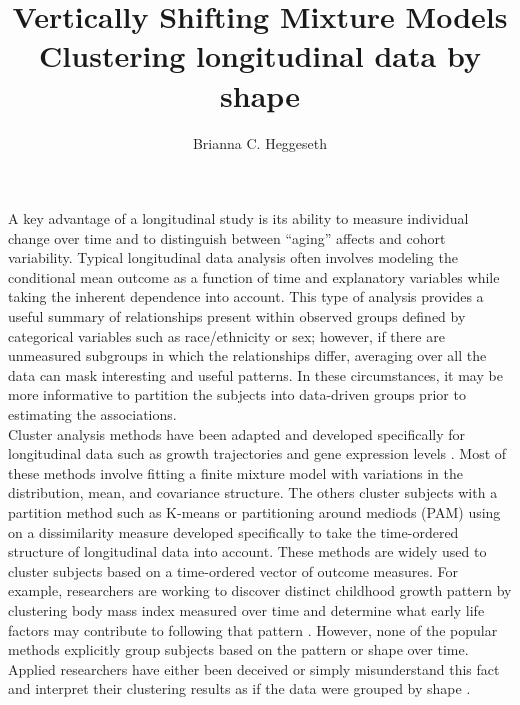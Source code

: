 \documentclass[12pt]{article}
\title{Vertically Shifting Mixture Models \\ Clustering longitudinal data by shape}
\author{Brianna C. Heggeseth}
\begin{document}
\doublespace
\maketitle

A key advantage of a longitudinal study is its ability to measure individual change over time and to distinguish between ``aging'' affects and cohort variability. Typical longitudinal data analysis often involves modeling the conditional mean outcome as a function of time and explanatory variables while taking the inherent dependence into account. This type of analysis provides a useful summary of relationships present within observed groups defined by categorical variables such as race/ethnicity or sex; however, if there are unmeasured subgroups in which the relationships differ, averaging over all the data can mask interesting and useful patterns. In these circumstances, it may be more informative to partition the subjects into data-driven groups prior to estimating the associations.\\

Cluster analysis methods have been adapted and developed specifically for longitudinal data such as growth trajectories and gene expression levels \cite{schneiderman1993,genolini2010, jones2001, muthen2010, mcnicholas2010}. Most of these methods involve fitting a finite mixture model with variations in the distribution, mean, and covariance structure. The others cluster subjects with a partition method such as K-means \cite{macqueen1967,hartigan1979,} or partitioning around mediods (PAM) \cite{kaufman1990} using on a dissimilarity measure developed specifically to take the time-ordered structure of longitudinal data into account. These methods are widely used to cluster subjects based on a time-ordered vector of outcome measures. For example, researchers are working to discover distinct childhood growth pattern by clustering body mass index measured over time and determine what early life factors may contribute to following that pattern \cite{pryor2011,carter2012}. However, none of the popular methods explicitly group subjects based on the pattern or shape over time. Applied researchers have either been deceived or simply misunderstand this fact and interpret their clustering results as if the data were grouped by shape \cite{pryor2011,carter2012,nagin1999}. \\
\end{document}
